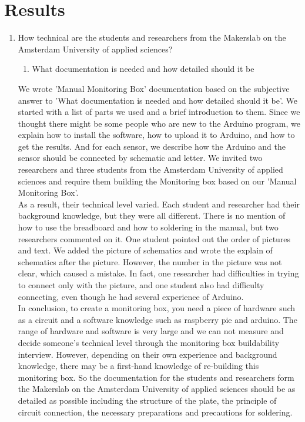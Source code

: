 \documentclass[conference]{IEEEtran}
\begin{document}
\section{Results}
\begin{enumerate}
\item How technical are the students and researchers from the Makerslab on the Amsterdam University of applied sciences?
\begin{enumerate}
\item What documentation is needed and how detailed should it be
\end{enumerate}
 We wrote 'Manual Monitoring Box' documentation based on the subjective answer to 'What documentation is needed and how detailed should it be'. We started with a list of parts we used and a brief introduction to them. Since we thought there might be some people who are new to the Arduino program, we explain how to install the software, how to upload it to Arduino, and how to get the results. And for each sensor, we describe how the Arduino and the sensor should be connected by schematic and letter. We invited two researchers and three students from the Amsterdam University of applied sciences and require them building the Monitoring box based on our 'Manual Monitoring Box'. \\
As a result, their technical level varied. Each student and researcher had their background knowledge, but they were all different. There is no mention of how to use the breadboard and how to soldering in the manual, but two researchers commented on it. One student pointed out the order of pictures and text. We added the picture of schematics and wrote the explain of schematics after the picture. However, the number in the picture was not clear, which caused a mistake. In fact, one researcher had difficulties in trying to connect only with the picture, and one student also had difficulty connecting, even though he had several experience of Arduino.\\
In conclusion, to create a monitoring box, you need a piece of hardware such as a circuit and a software knowledge such as raspberry pie and arduino. The range of hardware and software is very large and we can not measure and decide someone's technical level through the monitoring box buildability interview. However, depending on their own experience and background knowledge, there may be a first-hand knowledge of re-building this monitoring box. So the documentation for the students and researchers form the Makerslab on the Amsterdam University of applied sciences should be as detailed as possible including the structure of the plate, the principle of circuit connection, the necessary preparations and precautions for soldering.\\
 

\end{enumerate}
\end{document}
